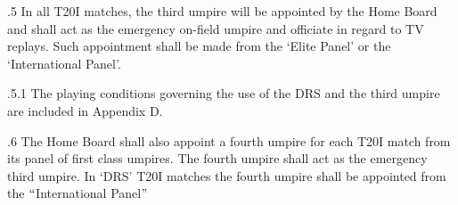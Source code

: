\documentclass[12pt]{article}
\begin{document}
\vspace{\baselineskip}
\begin{adjustwidth}{0.5in}{0.1in}
{\fontsize{9pt}{10.8pt}.5 \tabto{0.49in} In all T20I matches, the third umpire will be appointed by the Home Board and shall act as the emergency on-field umpire and officiate in regard to TV replays. Such appointment shall be made from the ‘Elite Panel’ or the ‘International Panel’.\par}\par

\end{adjustwidth}


\vspace{\baselineskip}
\begin{adjustwidth}{1.18in}{0.4in}
{\fontsize{9pt}{10.8pt}.5.1 \tabto{1.17in} The playing conditions governing the use of the DRS and the third umpire are included in Appendix D.\par}\par

\end{adjustwidth}


\vspace{\baselineskip}
\begin{adjustwidth}{0.5in}{0.03in}
\begin{justify}
{\fontsize{9pt}{10.8pt}.6 \tabto{0.49in} The Home Board shall also appoint a fourth umpire for each T20I match from its panel of first class umpires. The fourth umpire shall act as the emergency third umpire. In ‘DRS’ T20I matches the fourth umpire shall be appointed from the $``$International Panel$"$ \par}
\end{justify}\par

\end{adjustwidth}


\vspace{\baselineskip}

\vspace{\baselineskip}

\vspace{\baselineskip}

\vspace{\baselineskip}
\begin{adjustwidth}{0.0in}{-0.01in}
\begin{Center}
{\fontsize{8pt}{9.6pt}\par}
\end{Center}\par

\end{adjustwidth}
\end{document}
